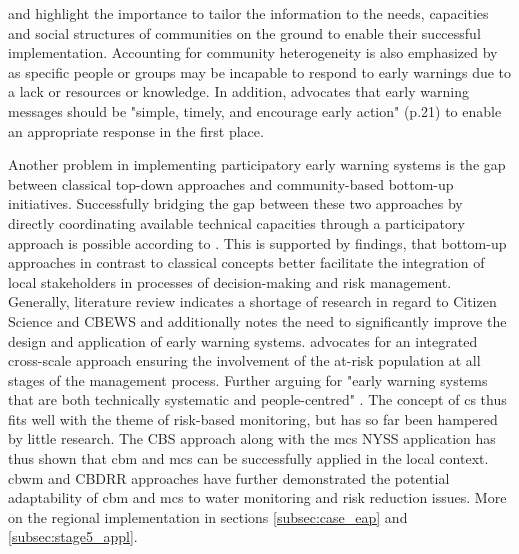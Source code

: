 \Textcite{gladfelterPoliticsParticipationCommunitybased2018,inayathEARLYWARNINGSYSTEM2018} and \textcite{trogrlicIndigenousKnowledgeEarly2018} highlight the importance to tailor the information to the needs, capacities and social structures of communities on the ground to enable their successful implementation. Accounting for community heterogeneity is also emphasized by \textcite{gladfelterPoliticsParticipationCommunitybased2018} as specific people or groups may be incapable to respond to early warnings due to a lack or resources or knowledge. In addition, \autocite{inayathEARLYWARNINGSYSTEM2018} advocates that early warning messages should be "simple, timely, and encourage early action" (p.21) to enable an appropriate response in the first place.\newline

Another problem in implementing participatory early warning systems is the gap between classical top-down approaches and community-based bottom-up initiatives. Successfully bridging the gap between these two approaches by directly coordinating available technical capacities through a participatory approach is possible according to \textcite{tarchianiCommunityImpactBased2020}. This is supported by \textcite{henriksenParticipatoryEarlyWarning2018} findings, that bottom-up approaches in contrast to classical concepts better facilitate the integration of local stakeholders in processes of decision-making and risk management. Generally, \textcite{marcheziniReviewStudiesParticipatory2018} literature review indicates a shortage of research in regard to Citizen Science and CBEWS and \textcite{baudoinEarlyWarningSystems2014} additionally notes the need to significantly improve the design and application of early warning systems. \Textcite{baudoinEarlyWarningSystems2014} advocates for an integrated cross-scale approach ensuring the involvement of the at-risk population at all stages of the management process. Further arguing for "early warning systems that are both technically systematic and people-centred" \autocite[15]{baudoinEarlyWarningSystems2014}. The concept of \acrshort{cs} thus fits well with the theme of risk-based monitoring, but has so far been hampered by little research.\newline
The CBS approach along with the \acrshort{mcs} NYSS application has thus shown that \acrshort{cbm} and \acrshort{mcs} can be successfully applied in the local context. \acrshort{cbwm} and CBDRR approaches have further demonstrated the potential adaptability of \acrshort{cbm} and \acrshort{mcs} to water monitoring and risk reduction issues. More on the regional implementation in sections \ref{subsec:case_eap} and \ref{subsec:stage5_appl}.

